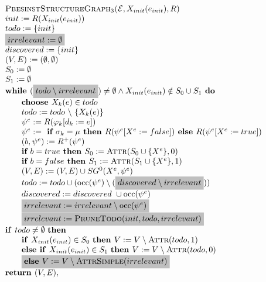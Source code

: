 \documentclass{article}
\newcommand{\Space}{\text{\ }}
\newcommand{\If}{\text{\textbf{if }}}
\newcommand{\Then}{\text{\textbf{then }}}
\newcommand{\Else}{\text{\textbf{else }}}
\begin{document}
\begin{equation*}
\begin{array}{l}
\textsc{PbesinstStructureGraph$_{3}$(}\mathcal{E}, X_{init}(e_{init}), R) \\ 
init:=R(X_{init}(e_{init})) \\
todo:=\{init\} \\
\colorbox{lightgray}{$irrelevant := \emptyset$} \\
discovered:=\{init\} \\
(V,E) :=(\emptyset ,\emptyset ) \\ 
S_0:= \emptyset \\
S_1:= \emptyset \\
\textbf{while }(\colorbox{lightgray}{$todo \setminus irrelevant$}) \neq \emptyset
\wedge X_{init}(e_{init}) \notin S_0 \cup S_1
\textbf{ do} \\ 
\qquad \text{\textbf{choose }}X_{k}(e)\in todo \\ 
\qquad todo:=todo\ \backslash \ \{X_{k}(e)\} \\ 
\qquad \psi ^{e}:=R(\varphi _{k}[d_{k}:=e]) \\ 
\qquad \psi^e := \textbf{ if } \sigma_k = \mu \textbf{ then } R(\psi^e[X^e := false])
\textbf{ else }  R(\psi^e[X^e := true]) \\
\qquad (b,\psi^e) := R^+(\psi^e) \\
\qquad \textbf{if $b = true$ then } S_0 := \textsc{Attr}(S_0 \cup \{ X^e \}, 0) \\
\qquad \textbf{if $b = false$ then } S_1 := \textsc{Attr}(S_1 \cup \{ X^e \}, 1) \\
\qquad (V,E) := (V,E) \cup SG^{0}(X^{e},\psi ^{e}) \\ 
\qquad todo := todo\cup (\mathrm{occ}(\psi ^{e})\setminus (\colorbox{lightgray}{$discovered \setminus irrelevant$})) \\
\qquad discovered := discovered\ \cup \mathrm{occ}(\psi^e) \\
\qquad \colorbox{lightgray}{$irrelevant := irrelevant \setminus \mathrm{occ}(\psi^e)$} \\
\qquad \colorbox{lightgray}{$irrelevant := \textsc{PruneTodo}(init, todo, irrelevant) $}\\
\If todo \neq \emptyset \Space \Then \\
\qquad \If X_{init}(e_{init}) \in S_0  \Space \Then V := V \setminus \textsc{Attr}(todo, 1) \\
\qquad \Else \If X_{init}(e_{init}) \in S_1 \Space \Then V := V \setminus \textsc{Attr}(todo, 0) \\
\qquad \colorbox{lightgray}{$\Else V := V \setminus \textsc{AttrSimple}(irrelevant)$} \\

\textbf{return }(V, E),
\end{array}
\end{equation*}
\end{document}
